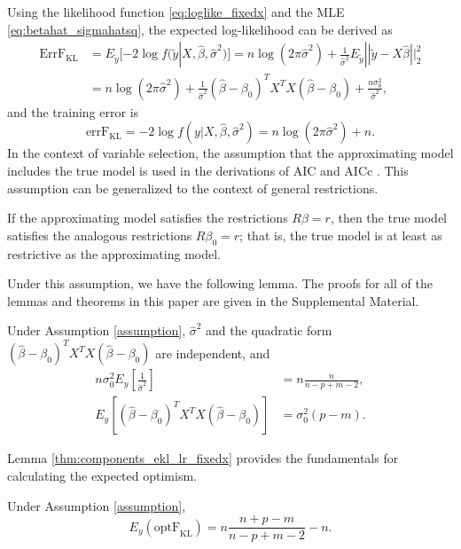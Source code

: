 Using the likelihood function \eqref{eq:loglike_fixedx} and the MLE \eqref{eq:betahat_sigmahatsq}, the expected log-likelihood can be derived as 
\begin{equation*}
\begin{aligned}
\text{ErrF}_\text{KL} &=  E_{\tilde{y}} [-2 \log f( \tilde{y} | X,\hat\beta,\hat\sigma^2 )] =  n \log (2\pi \hat\sigma^2) + \frac{1}{\hat\sigma^2} E_{\tilde{y}} || \tilde{y}-X\hat\beta||_2^2 \\
&= n \log (2\pi \hat\sigma^2) + \frac{1}{\hat\sigma^2}  (\hat\beta-\beta_0)^T X^T X (\hat\beta-\beta_0) + \frac{n\sigma_0^2}{\hat\sigma^2},
\end{aligned}
\end{equation*}
and the training error is 
\begin{equation*}
\text{errF}_\text{KL} = -2\log f(y|X,\hat\beta,\hat\sigma^2) = n\log(2\pi\hat\sigma^2) + n.
\end{equation*}
In the context of variable selection, the assumption that the approximating model includes the true model is used in the derivations of AIC \citep{linhart1986model} and AICc \citep{hurvich1989regression}. This assumption can be generalized to the context of general restrictions. 
\begin{assumption}
If the approximating model satisfies the restrictions $R\beta = r$, then the true model satisfies the analogous restrictions $R\beta_0 = r$; that is, the true model is at least as restrictive as the approximating model. 
\label{assumption}
\end{assumption}
Under this assumption, we have the following lemma. The proofs for all of the lemmas and theorems in this paper are given in the Supplemental Material.   
\begin{lemma}
  Under Assumption \ref{assumption}, $\hat\sigma^2$ and the quadratic form $(\hat \beta-\beta_0)^T X^T X (\hat \beta-\beta_0)$ are independent, and 
  \begin{equation*}
  \begin{aligned}
    n \sigma_0^2 E_y\left[ \frac{1}{\hat{\sigma}^2} \right] &= n\frac{n}{n-p+m-2},\\
    E_y  \left [ (\hat \beta-\beta_0)^T X^T X (\hat \beta-\beta_0) \right ] &= \sigma_0^2 (p-m).
  \end{aligned}
  \end{equation*}
\label{thm:components_ekl_lr_fixedx}
\end{lemma}
Lemma \ref{thm:components_ekl_lr_fixedx} provides the fundamentals for calculating the expected optimism.
\begin{theorem}
Under Assumption \ref{assumption}, 
\begin{equation*}
E_y(\text{optF}_\text{KL}) = n \frac{n+p-m}{n-p+m-2} - n.
\end{equation*}
\label{thm:EoptF_KL}
\end{theorem}

